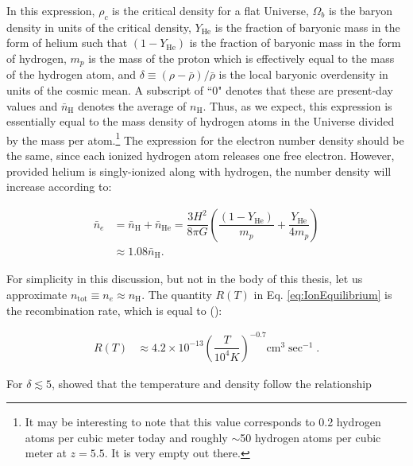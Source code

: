 In this expression, $\rho_c$ is the critical density for a flat Universe, $\Omega_{b}$ is the baryon density in units of the critical density, $Y_{\text{He}}$ is the fraction of baryonic mass in the form of helium such that $(1-Y_{\text{He}})$ is the fraction of baryonic mass in the form of hydrogen, $m_{p}$ is the mass of the proton which is effectively equal to the mass of the hydrogen atom, and $\delta \equiv (\rho-\bar{\rho})/\bar{\rho}$ is the local baryonic overdensity in units of the cosmic mean. A subscript of ``0" denotes that these are present-day values and $\bar{n}_{\text{H}}$ denotes the average of $n_{\text{H}}$. Thus, as we expect, this expression is essentially equal to the mass density of hydrogen atoms in the Universe divided by the mass per atom.\footnote{It may be interesting to note that this value corresponds to 0.2 hydrogen atoms per cubic meter today and roughly $\sim$50 hydrogen atoms per cubic meter at $z = 5.5$. It is very empty out there.}  The expression for the electron number density should be the same, since each ionized hydrogen atom releases one free electron. However, provided helium is singly-ionized along with hydrogen, the number density will increase according to:

\begin{align}
\bar{n}_e &= \bar{n}_{\text{H}} + \bar{n}_{\text{He}} = \dfrac{3H^2}{8\pi G}\left( \dfrac{(1-Y_{\text{He}})}{m_{p}} + \dfrac{Y_{\text{He}}}{4m_{p}} \right) \\
&\approx 1.08 \bar{n}_{\text{H}}. 
\end{align}

For simplicity in this discussion, but not in the body of this thesis, let us approximate $n_{\text{tot}} \equiv n_{e} \approx n_{\text{H}}$. The quantity $R(T)$ in Eq. \ref{eq:IonEquilibrium} is the recombination rate, which is equal to (\citealt{Hui1997}):

\begin{align}
R(T) &\approx 4.2 \times 10^{-13}\left( \dfrac{T}{10^{4} K}\right)^{-0.7} \text{cm}^{3}\sec^{-1}. \label{eq:RecombinationRate}
\end{align}

For $\delta \lesssim 5$, \citet{Hui1997} showed that the temperature and density follow the relationship

